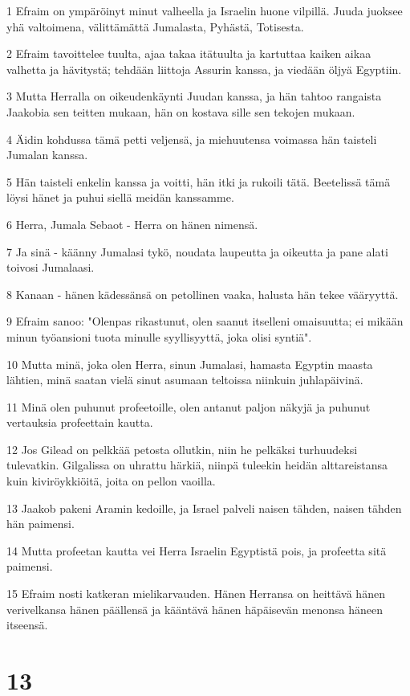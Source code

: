 \par 1 Efraim on ympäröinyt minut valheella ja Israelin huone vilpillä. Juuda juoksee yhä valtoimena, välittämättä Jumalasta, Pyhästä, Totisesta.
\par 2 Efraim tavoittelee tuulta, ajaa takaa itätuulta ja kartuttaa kaiken aikaa valhetta ja hävitystä; tehdään liittoja Assurin kanssa, ja viedään öljyä Egyptiin.
\par 3 Mutta Herralla on oikeudenkäynti Juudan kanssa, ja hän tahtoo rangaista Jaakobia sen teitten mukaan, hän on kostava sille sen tekojen mukaan.
\par 4 Äidin kohdussa tämä petti veljensä, ja miehuutensa voimassa hän taisteli Jumalan kanssa.
\par 5 Hän taisteli enkelin kanssa ja voitti, hän itki ja rukoili tätä. Beetelissä tämä löysi hänet ja puhui siellä meidän kanssamme.
\par 6 Herra, Jumala Sebaot - Herra on hänen nimensä.
\par 7 Ja sinä - käänny Jumalasi tykö, noudata laupeutta ja oikeutta ja pane alati toivosi Jumalaasi.
\par 8 Kanaan - hänen kädessänsä on petollinen vaaka, halusta hän tekee vääryyttä.
\par 9 Efraim sanoo: "Olenpas rikastunut, olen saanut itselleni omaisuutta; ei mikään minun työansioni tuota minulle syyllisyyttä, joka olisi syntiä".
\par 10 Mutta minä, joka olen Herra, sinun Jumalasi, hamasta Egyptin maasta lähtien, minä saatan vielä sinut asumaan teltoissa niinkuin juhlapäivinä.
\par 11 Minä olen puhunut profeetoille, olen antanut paljon näkyjä ja puhunut vertauksia profeettain kautta.
\par 12 Jos Gilead on pelkkää petosta ollutkin, niin he pelkäksi turhuudeksi tulevatkin. Gilgalissa on uhrattu härkiä, niinpä tuleekin heidän alttareistansa kuin kiviröykkiöitä, joita on pellon vaoilla.
\par 13 Jaakob pakeni Aramin kedoille, ja Israel palveli naisen tähden, naisen tähden hän paimensi.
\par 14 Mutta profeetan kautta vei Herra Israelin Egyptistä pois, ja profeetta sitä paimensi.
\par 15 Efraim nosti katkeran mielikarvauden. Hänen Herransa on heittävä hänen verivelkansa hänen päällensä ja kääntävä hänen häpäisevän menonsa häneen itseensä.

\chapter{13}

